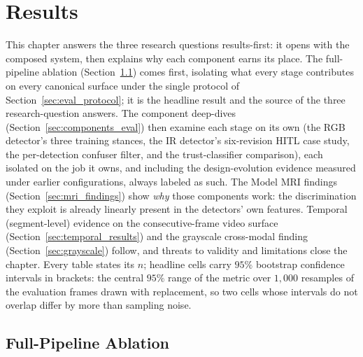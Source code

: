 \chapter{Results}
\label{ch:hitl}

This chapter answers the three research questions results-first: it opens with the composed system, then explains why each component earns its place. The full-pipeline ablation (Section~\ref{sec:pipeline_ablation}) comes first, isolating what every stage contributes on every canonical surface under the single protocol of Section~\ref{sec:eval_protocol}; it is the headline result and the source of the three research-question answers. The component deep-dives (Section~\ref{sec:components_eval}) then examine each stage on its own (the RGB detector's three training stances, the IR detector's six-revision HITL case study, the per-detection confuser filter, and the trust-classifier comparison), each isolated on the job it owns, and including the design-evolution evidence measured under earlier configurations, always labeled as such. The Model MRI findings (Section~\ref{sec:mri_findings}) show \emph{why} those components work: the discrimination they exploit is already linearly present in the detectors' own features. Temporal (segment-level) evidence on the consecutive-frame video surface (Section~\ref{sec:temporal_results}) and the grayscale cross-modal finding (Section~\ref{sec:grayscale}) follow, and threats to validity and limitations close the chapter. Every table states its $n$; headline cells carry $95\%$ bootstrap confidence intervals in brackets: the central $95\%$ range of the metric over $1{,}000$ resamples of the evaluation frames drawn with replacement, so two cells whose intervals do not overlap differ by more than sampling noise.

\section{Full-Pipeline Ablation}
\label{sec:pipeline_ablation}
\label{ch:experiments}

